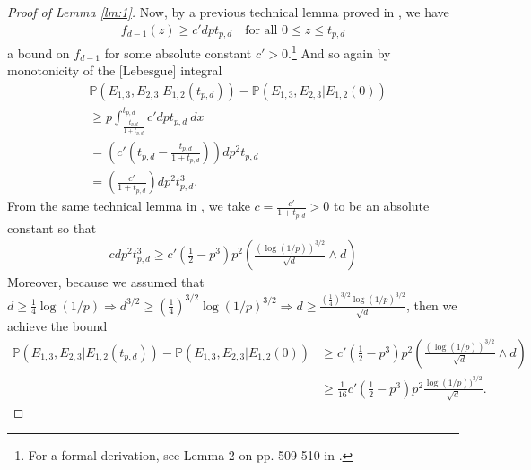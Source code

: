 \documentclass{article}
\begin{document}
\begin{proof}[Proof of Lemma \ref{lm:1}]
Now, by a previous technical lemma proved in \cite{bubeck2016testing}, we have 
\begin{align*}
    f_{d-1}(z) \geq c'dpt_{p,d} \quad \text{for all $0 \leq z \leq t_{p,d}$}
\end{align*}
a bound on $f_{d-1}$ for some absolute constant $c' > 0$.\footnote{For a formal derivation, see Lemma 2 on pp. 509-510 in \cite{bubeck2016testing}.} And so again by monotonicity of the [Lebesgue] integral 
\begin{align*}
    & \mathbb{P}(E_{1,3}, E_{2,3} | E_{1,2}(t_{p,d})) - \mathbb{P}(E_{1,3},E_{2,3}| E_{1,2}(0))\\ 
    &\geq p\int_{\frac{t_{p,d}}{1 + t_{p,d}}}^{t_{p,d}} c'dpt_{p,d} \ dx\\
    &= \left(c' \left(t_{p,d} -  \frac{t_{p,d}}{1 + t_{p,d}} \right) \right)dp^2t_{p,d}\\
    &= \left(\frac{c'}{1 + t_{p,d}} \right)dp^2t_{p,d}^3.
\end{align*}
From the same technical lemma in \cite{bubeck2016testing}, we take $c = \frac{c'}{1 + t_{p,d}} > 0$ to be an absolute constant so that
\begin{align*}
    cdp^2t_{p,d}^3 \geq c'\left( \frac{1}{2} - p^3 \right)p^2 \left(\frac{(\log(1/p))^{3/2}}{\sqrt{d}} \wedge d \right)
\end{align*}
Moreover, because we assumed that $d \geq \frac{1}{4} \log(1/p) \Rightarrow d^{3/2} \geq \left( \frac{1}{4} \right)^{3/2} \log(1/p)^{3/2} \Rightarrow d \geq \frac{\left( \frac{1}{4} \right)^{3/2} \log(1/p)^{3/2}}{\sqrt{d}}$, then we achieve the bound
\begin{align}
    \mathbb{P}(E_{1,3}, E_{2,3} | E_{1,2}(t_{p,d})) - \mathbb{P}(E_{1,3},E_{2,3}| E_{1,2}(0)) &\geq c'\left( \frac{1}{2} - p^3 \right)p^2 \left(\frac{(\log(1/p))^{3/2}}{\sqrt{d}} \wedge d \right)  \nonumber \\
    &\geq \frac{1}{16}c'\left( \frac{1}{2} - p^3 \right)p^2 \frac{\log(1/p))^{3/2}}{\sqrt{d}}\label{eq7}.
\end{align}


\end{proof}
\end{document}
